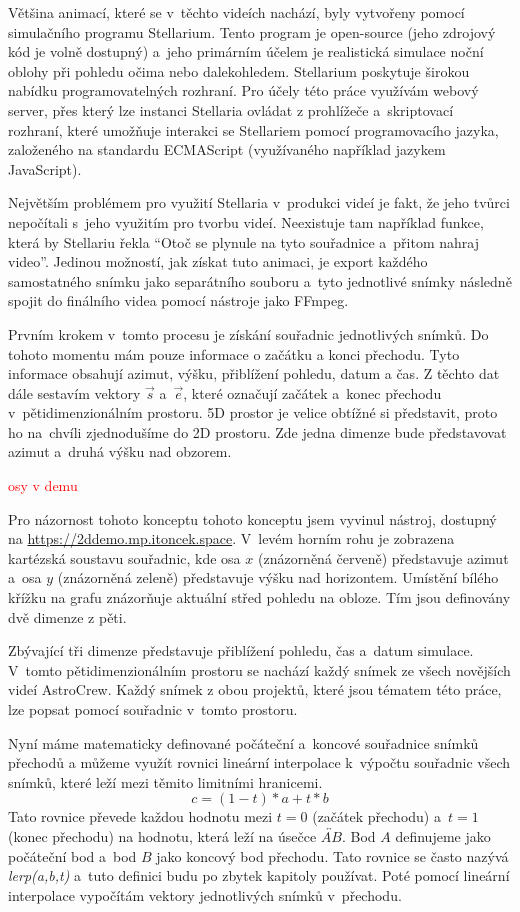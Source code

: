 \documentclass[12pt,a4paper,titlepage]{article}
\begin{document}
Většina animací, které se v~těchto videích nachází, byly vytvořeny pomocí simulačního programu Stellarium. Tento program je open-source (jeho zdrojový kód je volně dostupný) a~jeho primárním účelem je realistická simulace noční oblohy při pohledu očima nebo dalekohledem. Stellarium poskytuje širokou nabídku programovatelných rozhraní. Pro účely této práce využívám webový server, přes který lze instanci Stellaria ovládat z prohlížeče a~skriptovací rozhraní, které umožňuje interakci se Stellariem pomocí programovacího jazyka, založeného na standardu ECMAScript (využívaného například jazykem JavaScript).

Největším problémem pro využití Stellaria v~produkci videí je fakt, že jeho tvůrci nepočítali s~jeho využitím pro tvorbu videí. Neexistuje tam například funkce, která by Stellariu řekla \enquote{Otoč se plynule na tyto souřadnice a~přitom nahraj video}. Jedinou možností, jak získat tuto animaci, je export každého samostatného snímku jako separátního souboru a~tyto jednotlivé snímky následně spojit do finálního videa pomocí nástroje jako FFmpeg. 

Prvním krokem v~tomto procesu je získání souřadnic jednotlivých snímků. Do tohoto momentu mám pouze informace o začátku a konci přechodu. Tyto informace obsahují azimut, výšku, přiblížení pohledu, datum a čas. Z těchto dat dále sestavím vektory $\vec{s}$ a~$\vec{e}$, které označují začátek a~konec přechodu v~pětidimenzionálním prostoru. 5D prostor je velice obtížné si představit, proto ho na~chvíli zjednodušíme do 2D prostoru. Zde jedna dimenze bude představovat azimut a~druhá výšku nad obzorem. 

\textcolor{red}{osy v demu}

Pro názornost tohoto konceptu tohoto konceptu jsem vyvinul nástroj, dostupný na \url{https://2ddemo.mp.itoncek.space}. V~levém horním rohu je zobrazena kartézská soustavu souřadnic, kde osa $x$ (znázorněná červeně) představuje azimut a~osa $y$ (znázorněná zeleně) představuje výšku nad horizontem. Umístění bílého křížku na grafu znázorňuje aktuální střed pohledu na obloze. Tím jsou definovány dvě dimenze z pěti.

Zbývající tři dimenze představuje přiblížení pohledu, čas a~datum simulace. V~tomto pětidimenzionálním prostoru se nachází každý snímek ze všech novějších videí AstroCrew. Každý snímek z obou projektů, které jsou tématem této práce, lze popsat pomocí souřadnic v~tomto prostoru.

Nyní máme matematicky definované počáteční a~koncové souřadnice snímků přechodů a můžeme využít rovnici lineární interpolace k~výpočtu souřadnic všech snímků, které leží mezi těmito limitními hranicemi.
\[c = (1-t)*a + t * b\] 
Tato rovnice převede každou hodnotu mezi $t=0$ (začátek přechodu) a~$t=1$ (konec přechodu) na hodnotu, která leží na úsečce $\overleftrightarrow{AB}$. Bod $A$ definujeme jako počáteční bod a~bod $B$ jako koncový bod přechodu. Tato rovnice se často nazývá \textit{lerp(a,b,t)} a~tuto definici budu po zbytek kapitoly používat. Poté pomocí lineární interpolace vypočítám vektory jednotlivých snímků v~přechodu.%
\end{document}
